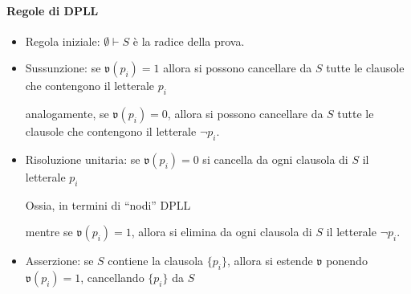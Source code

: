 \paragraph{Regole di DPLL}
\begin{itemize}
        \item Regola iniziale: $\emptyset \vdash S$ è la radice della prova. 
        \item Sussunzione: se $\mathfrak{v}(p_i) = 1$ allora si possono cancellare 
                da $S$ tutte le clausole che contengono  il letterale $p_i$
                \begin{prooftree}
                \end{prooftree}
                analogamente, se $\mathfrak{v}(p_i) = 0$, allora si possono cancellare 
                da $S$ tutte le clausole che contengono il letterale $\neg p_i$. 
        \item Risoluzione unitaria: se $\mathfrak{v}(p_i) = 0$ si cancella 
                da ogni clausola di $S$ il letterale $p_i$
                \begin{prooftree}
                \end{prooftree}
                Ossia, in termini di ``nodi'' DPLL
                \begin{prooftree}
                \end{prooftree}
               mentre se $\mathfrak{v}(p_i) = 1$, 
        allora si elimina da ogni clausola di $S$ il letterale $\neg p_i$.  
        \item Asserzione: se $S$ contiene la clausola $\{p_i\}$, allora 
                si estende $\mathfrak{v}$ ponendo $\mathfrak{v}(p_i) = 1$, 
                cancellando $\{p_i\}$ da $S$
                \begin{prooftree}
                \end{prooftree}

\end{itemize}
